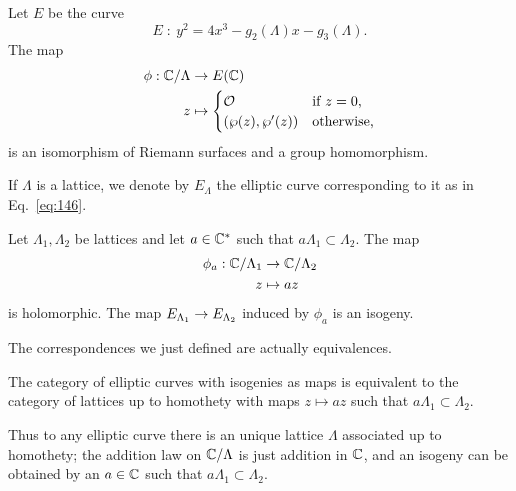 \begin{theorem}
  Let $E$ be the curve 
  \begin{equation}
    \label{eq:146}
    E\;:\: y^2=4x^3-g_2(\Lambda)x-g_3(\Lambda)
    \text{.}
  \end{equation}
  The map
  \begin{equation}
    \label{eq:147}
    \begin{aligned}
      \phi: \mathbb{C}/\Lambda &\rightarrow E(\mathbb{C})\\
      z &\mapsto
      \begin{cases}
        \mathcal{O} &\text{if $z=0$,}\\
        (\wp(z), \wp'(z)) &\text{otherwise,}
      \end{cases}
    \end{aligned}
  \end{equation}
  is an isomorphism of Riemann surfaces and a group homomorphism. 
\end{theorem}

If $\Lambda$ is a lattice, we denote by $E_\Lambda$ the elliptic curve
corresponding to it as in Eq.~\eqref{eq:146}.

\begin{theorem}
  Let $\Lambda_1,\Lambda_2$ be lattices and let $a\in\mathbb{C}^\ast$ such that
  $a\Lambda_1\subset\Lambda_2$. The map
  \begin{equation}
    \label{eq:148}
    \begin{aligned}
      \phi_a:\mathbb{C}/\Lambda_1&\rightarrow\mathbb{C}/\Lambda_2\\
      z&\mapsto az
    \end{aligned}
  \end{equation}
  is holomorphic. The map $E_{\Lambda_1}\rightarrow E_{\Lambda_2}$ induced by
  $\phi_a$ is an isogeny.
\end{theorem}

The correspondences we just defined are actually equivalences.

\begin{theorem}
  The category of elliptic curves with isogenies as maps is equivalent
  to the category of lattices up to homothety with maps $z\mapsto az$
  such that $a\Lambda_1\subset\Lambda_2$.
\end{theorem}

Thus to any elliptic curve there is an unique lattice $\Lambda$
associated up to homothety; the addition law on $\mathbb{C}/\Lambda$ is just
addition in $\mathbb{C}$, and an isogeny can be obtained by an $a\in\mathbb{C}$ such
that $a\Lambda_1\subset\Lambda_2$.



